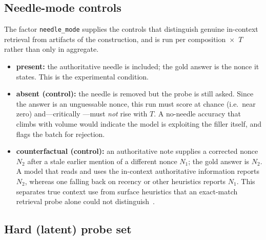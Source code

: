 \documentclass[11pt]{article}
\begin{document}
\subsection{Needle-mode controls}
\label{sec:method:controls}

The factor \texttt{needle\_mode} supplies the controls that distinguish genuine in-context
retrieval from artifacts of the construction, and is run per composition~$\times$~$T$ rather than
only in aggregate.
\begin{itemize}
  \item \textbf{present:} the authoritative needle is included; the gold answer is the
    nonce it states. This is the experimental condition.
  \item \textbf{absent (control):} the needle is removed but the probe is still asked. Since the
    answer is an unguessable nonce, this run must score at chance (i.e.\ near zero) and---critically
    ---must \emph{not} rise with $T$. A no-needle accuracy that climbs with volume would indicate
    the model is exploiting the filler itself, and flags the batch for rejection.
  \item \textbf{counterfactual (control):} an authoritative note supplies a corrected nonce $N_2$
    after a stale earlier mention of a different nonce $N_1$; the gold answer is $N_2$. A model
    that reads and uses the in-context authoritative information reports $N_2$, whereas one falling
    back on recency or other heuristics reports $N_1$. This separates true context use from
    surface heuristics that an exact-match retrieval probe alone could not
    distinguish~\cite{liu2024lostmiddle,modarressi2025nolima}.
\end{itemize}

\subsection{Hard (latent) probe set}
\label{sec:method:hard}
\end{document}
